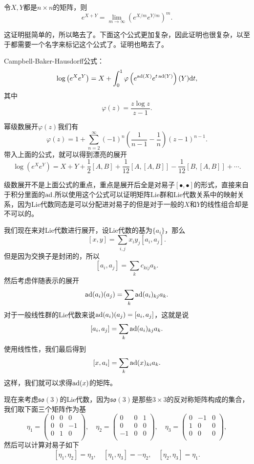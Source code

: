 \pro
令$X,Y$都是$n\times n$的矩阵，则
\[
	e^{X+Y}=\lim_{m\to\infty}\left(e^{X/m}e^{Y/m}\right)^m.
\]

这证明挺简单的，所以略去了。下面这个公式更加复杂，因此证明也很复杂，以至于都需要一个名字来标记这个公式了。证明也略去了。

\theo Campbell-Baker-Hausdorff公式：
\[
\log\left(e^Xe^Y\right)=X+\int_0^1 \varphi\left(e^{\operatorname{ad}(X)}e^{t\operatorname{ad}(Y)}\right)(Y)\mathrm{d} t,
\]
其中
\[
\varphi(z)=\frac{z\log z}{z-1}.
\]

幂级数展开$\varphi(z)$我们有
\[
	\varphi(z)=1+\sum_{n=2}^\infty (-1)^n\left(\frac{1}{n-1}-\frac{1}{n}\right)(z-1)^{n-1}.
\]
带入上面的公式，就可以得到漂亮的展开
\[
\log\left(e^Xe^Y\right)=X+Y+\frac{1}{2}[A,B]+\frac{1}{12}[A,[A,B]]-\frac{1}{12}[B,[A,B]]+\cdots.
\]

级数展开不是上面公式的重点，重点是展开后全是对易子$[\bullet,\bullet]$的形式，直接来自于积分里面的$\operatorname{ad}$.所以使用这个公式可以证明矩阵Lie群和Lie代数关系中的映射关系，因为Lie代数同态是可以分配进对易子的但是对于一般的$X$和$Y$的线性组合却是不可以的。

我们现在来对Lie代数进行展开，设Lie代数的基为$\{a_i\}$，那么
\[
[x,y]=\sum_{i,j}x_iy_j[a_i,a_j].
\]
但是因为交换子是封闭的，所以
\[
	[a_i,a_j]=\sum_k c_{kij}a_k.
\]
然后考虑伴随表示的展开
\[
	\operatorname{ad}(a_i)(a_j)=\sum_k \operatorname{ad}(a_i)_{kj}a_k.
\]
对于一般线性群的Lie代数来说$\operatorname{ad}(a_i)(a_j)=[a_i,a_j]$，这就是说
\[
	[a_i,a_j]=\sum_k \operatorname{ad}(a_i)_{kj}a_k.
\]
使用线性性，我们最后得到
\[
	[x,a_i]=\sum_k \operatorname{ad}(x)_{ki}a_k.
\]
这样，我们就可以求得$\operatorname{ad}(x)$的矩阵。

现在来考虑$\mathfrak{so}(3)$的Lie代数，因为$\mathfrak{so}(3)$是那些$3\times 3$的反对称矩阵构成的集合，我们取下面三个矩阵作为基
\[
	\eta_1=
		\begin{pmatrix}
			0&0&0\\
			0&0&-1\\
			0&1&0\\
		\end{pmatrix},\quad
	\eta_2=
		\begin{pmatrix}
			0&0&1\\
			0&0&0\\
			-1&0&0\\
		\end{pmatrix},\quad
	\eta_3=
		\begin{pmatrix}
			0&-1&0\\
			1&0&0\\
			0&0&0\\
		\end{pmatrix},
\]
然后可以计算对易子如下
\[
	[\eta_1,\eta_2]=\eta_3,\quad [\eta_1,\eta_3]=-\eta_2,\quad [\eta_2,\eta_3]=\eta_1.
\]

